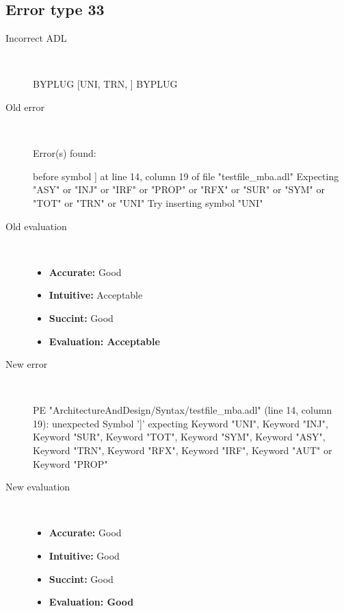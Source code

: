 \hrulefill

\subsection{Error type 33}
  \begin{description}
  \item[Incorrect ADL]~\\
\begin{adl}
BYPLUG [UNI, TRN, ] BYPLUG\end{adl}
  \item[Old error]~\\
\begin{haskell}
Error(s) found:

before symbol ] at line 14, column 19 of file "testfile_mba.adl"
Expecting "ASY" or "INJ" or "IRF" or "PROP" or "RFX" or "SUR" or "SYM" or "TOT"
or "TRN" or "UNI"
Try inserting symbol "UNI"
\end{haskell}
  \item[Old evaluation]~\\
    \begin{itemize}
    \item \textbf{Accurate:} Good
    \item \textbf{Intuitive:} Acceptable
    \item \textbf{Succint:} Good
    \item \textbf{Evaluation: Acceptable}
    \end{itemize}
  \item[New error]~\\
\begin{haskell}
PE "ArchitectureAndDesign/Syntax/testfile_mba.adl" (line 14, column 19):
unexpected Symbol ']'
expecting Keyword "UNI", Keyword "INJ", Keyword "SUR", Keyword "TOT", Keyword "SYM", Keyword "ASY", Keyword "TRN", Keyword "RFX", Keyword "IRF", Keyword "AUT" or Keyword "PROP"
\end{haskell}
  \item[New evaluation]~\\
    \begin{itemize}
    \item \textbf{Accurate:} Good
    \item \textbf{Intuitive:} Good
    \item \textbf{Succint:} Good
    \item \textbf{Evaluation: Good
}
    \end{itemize}
  \end{description}

